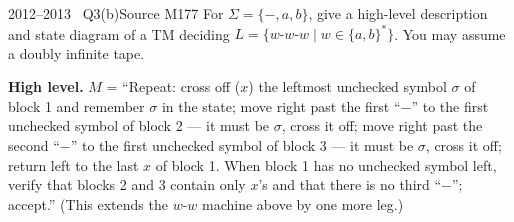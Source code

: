 \documentclass[11pt,a4paper]{article}
\begin{document}
\begin{question}{2012--2013 \textbullet\ Q3(b)}{Source M17}{7}
For $\Sigma=\{-,a,b\}$, give a high-level description and state diagram of a TM deciding $L=\{w\text{-}w\text{-}w\mid w\in\{a,b\}^*\}$. You may assume a doubly infinite tape.
\end{question}
\begin{solution}
\textbf{High level.} $M$ = ``Repeat: cross off ($x$) the leftmost unchecked symbol $\sigma$ of block 1 and remember $\sigma$ in the state; move right past the first ``$-$'' to the first unchecked symbol of block 2 --- it must be $\sigma$, cross it off; move right past the second ``$-$'' to the first unchecked symbol of block 3 --- it must be $\sigma$, cross it off; return left to the last $x$ of block 1. When block 1 has no unchecked symbol left, verify that blocks 2 and 3 contain only $x$'s and that there is no third ``$-$''; accept.'' (This extends the $w$-$w$ machine above by one more leg.)


\end{solution}
\end{document}
